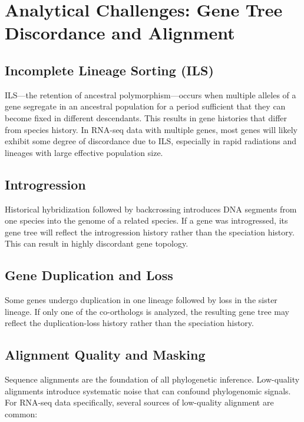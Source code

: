 \section{Analytical Challenges: Gene Tree Discordance and Alignment}

\subsection{Incomplete Lineage Sorting (ILS)}

ILS---the retention of ancestral polymorphism---occurs when multiple alleles of a gene segregate in an ancestral population for a period sufficient that they can become fixed in different descendants. This results in gene histories that differ from species history. In RNA-seq data with multiple genes, most genes will likely exhibit some degree of discordance due to ILS, especially in rapid radiations and lineages with large effective population size.

\subsection{Introgression}

Historical hybridization followed by backcrossing introduces DNA segments from one species into the genome of a related species. If a gene was introgressed, its gene tree will reflect the introgression history rather than the speciation history. This can result in highly discordant gene topology.

\subsection{Gene Duplication and Loss}

Some genes undergo duplication in one lineage followed by loss in the sister lineage. If only one of the co-orthologs is analyzed, the resulting gene tree may reflect the duplication-loss history rather than the speciation history.

\subsection{Alignment Quality and Masking}

Sequence alignments are the foundation of all phylogenetic inference. Low-quality alignments introduce systematic noise that can confound phylogenomic signals. For RNA-seq data specifically, several sources of low-quality alignment are common:

